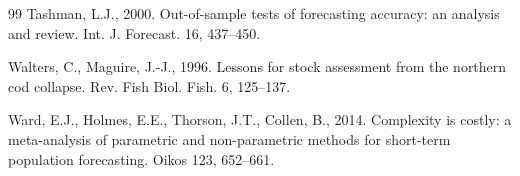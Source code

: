 \documentclass[preprint,11pt,authoryear]{elsarticle}
\theoremstyle{definition}
\theoremstyle{remark}
\begin{document}
\begin{thebibliography}{99}
Tashman, L.J., 2000. Out-of-sample tests of forecasting accuracy: an analysis and review. Int. J. Forecast. 16, 437--450.

Walters, C., Maguire, J.-J., 1996. Lessons for stock assessment from the northern cod collapse. Rev. Fish Biol. Fish. 6, 125--137.

Ward, E.J., Holmes, E.E., Thorson, J.T., Collen, B., 2014. Complexity is costly: a meta-analysis of parametric and non-parametric methods for short-term population forecasting. Oikos 123, 652--661.

\end{thebibliography}
\end{document}
